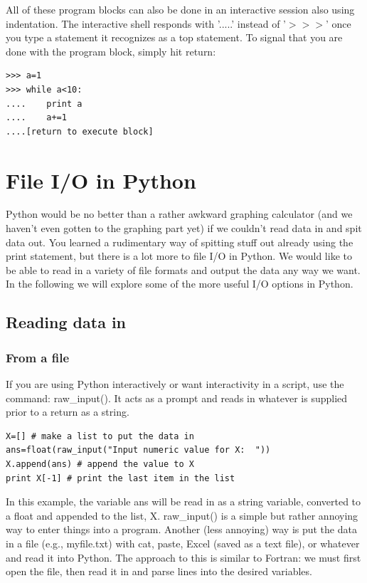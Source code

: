 \documentclass[11pt]{book}
\begin{document}
{All of these program blocks can also be done in an interactive session also using indentation.  The interactive shell responds with '.....'  instead of '$>>>$' once you type a statement it recognizes as a top statement.   To signal that you are done with the program block, simply hit return: 


{ \color{blue} \begin{verbatim}
>>> a=1
>>> while a<10:
....    print a
....    a+=1
....[return to execute block]
\end{verbatim}}



\section{File I/O in Python}

Python would be no better than a rather awkward graphing calculator (and we haven't even gotten to the graphing part yet) if we couldn't read data in and spit data out.   You learned a rudimentary way of spitting stuff out already using the {\color{blue}print} statement, but there is a lot more to file I/O in Python.  We would like to be able to read in a variety of file formats  and output the data any way we want.  In the following we will explore some of the more useful  I/O options in Python.  




\subsection{Reading data in}
\subsubsection{From a file}

If you are using Python interactively or want interactivity in a script,  use the command:  {\color{blue}raw\_input()}.  It acts as a prompt and reads in whatever is supplied prior to a return as a string.  

{ \color{blue} \begin{verbatim}
X=[] # make a list to put the data in
ans=float(raw_input("Input numeric value for X:  ")) 
X.append(ans) # append the value to X
print X[-1] # print the last item in the list
\end{verbatim}}
\noindent
In this example, the variable {\color{blue}ans} will be read in as a string variable,  converted to a float and appended to the list, {\color{blue}X}.    {\color{blue}raw\_input()} is a simple but rather annoying way to enter things into a program.  
Another (less annoying)  way is  put the data in a file (e.g., myfile.txt) with cat, paste, Excel (saved as a text file), or whatever and read  it into Python.  The approach to this is similar to Fortran:  we must first open the file, then read it in and parse lines into the desired variables.  

}
\end{document}
